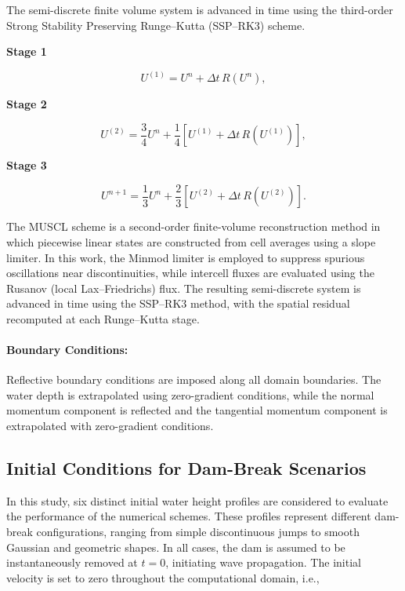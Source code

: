 \documentclass[12pt]{article}
\begin{document}
The semi-discrete finite volume system is advanced in time using the third-order Strong Stability Preserving Runge--Kutta (SSP--RK3) scheme.

\textbf{Stage 1}

\begin{equation}
U^{(1)}
=
U^{n}
+
\Delta t\,R(U^{n}),
\label{eq:rk3_stage1}
\end{equation}

\textbf{Stage 2}

\begin{equation}
U^{(2)}
=
\frac{3}{4}U^{n}
+
\frac{1}{4}
\left[
U^{(1)}
+
\Delta t\,R(U^{(1)})
\right],
\label{eq:rk3_stage2}
\end{equation}

\textbf{Stage 3}

\begin{equation}
U^{n+1}
=
\frac{1}{3}U^{n}
+
\frac{2}{3}
\left[
U^{(2)}
+
\Delta t\,R(U^{(2)})
\right].
\label{eq:rk3_stage3}
\end{equation}

The MUSCL scheme is a second-order finite-volume reconstruction method in which piecewise linear states are constructed from cell averages using a slope limiter. In this work, the Minmod limiter is employed to suppress spurious oscillations near discontinuities, while intercell fluxes are evaluated using the Rusanov (local Lax–Friedrichs) flux. The resulting semi-discrete system is advanced in time using the SSP–RK3 method, with the spatial residual recomputed at each Runge–Kutta stage.
\paragraph{Boundary Conditions:}

Reflective boundary conditions are imposed along all domain boundaries. The water depth is extrapolated using zero-gradient conditions, while the normal momentum component is reflected and the tangential momentum component is extrapolated with zero-gradient conditions.

\subsection{Initial Conditions for Dam-Break Scenarios}

In this study, six distinct initial water height profiles are considered to evaluate the performance of the numerical schemes. These profiles represent different dam-break configurations, ranging from simple discontinuous jumps to smooth Gaussian and geometric shapes. In all cases, the dam is assumed to be instantaneously removed at $t=0$, initiating wave propagation. The initial velocity is set to zero throughout the computational domain, i.e.,
\end{document}
